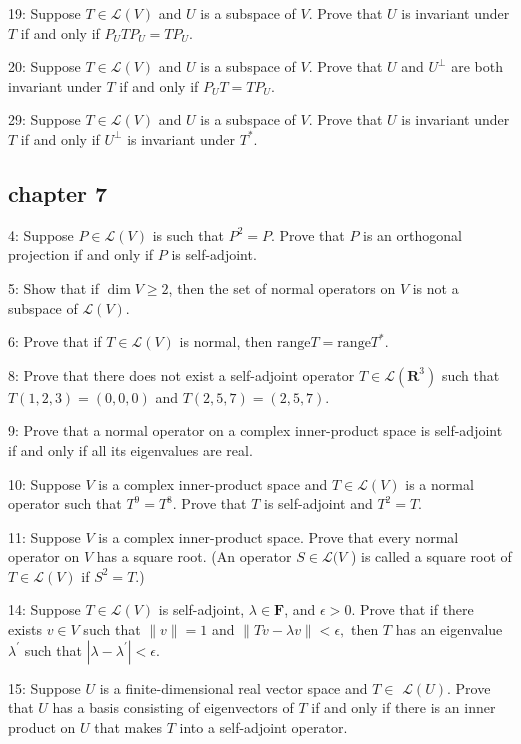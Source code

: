 \documentclass{article}
\begin{document}
19: Suppose $T \in \mathcal{L}(V)$ and $U$ is a subspace of $V$. Prove that $U$ is invariant under $T$ if and only if $P_{U} T P_{U}=T P_{U}$.

20: Suppose $T \in \mathcal{L}(V)$ and $U$ is a subspace of $V$. Prove that $U$ and $U^{\perp}$ are both invariant under $T$ if and only if $P_{U} T=T P_{U}$.

29: Suppose $T \in \mathcal{L}(V)$ and $U$ is a subspace of $V$. Prove that $U$ is invariant under $T$ if and only if $U^{\perp}$ is invariant under $T^{*}$.

\subsection*{chapter 7}
4: Suppose $P \in \mathcal{L}(V)$ is such that $P^{2}=P$. Prove that $P$ is an orthogonal projection if and only if $P$ is self-adjoint.

5: Show that if $\operatorname{dim} V \geq 2$, then the set of normal operators on $V$ is not a subspace of $\mathcal{L}(V)$.

6: Prove that if $T \in \mathcal{L}(V)$ is normal, then $\mathrm{range} T=\mathrm{range} T^{*}.$

8: Prove that there does not exist a self-adjoint operator $T \in \mathcal{L}\left(\mathbf{R}^{3}\right)$ such that $T(1,2,3)=(0,0,0)$ and $T(2,5,7)=(2,5,7)$.

9: Prove that a normal operator on a complex inner-product space is self-adjoint if and only if all its eigenvalues are real.

10: Suppose $V$ is a complex inner-product space and $T \in \mathcal{L}(V)$ is a normal operator such that $T^{9}=T^{8}$. Prove that $T$ is self-adjoint and $T^{2}=T$.

11: Suppose $V$ is a complex inner-product space. Prove that every normal operator on $V$ has a square root. (An operator $S \in \mathcal{L}(V$ ) is called a square root of $T \in \mathcal{L}(V)$ if $S^{2}=T$.)

14: Suppose $T \in \mathcal{L}(V)$ is self-adjoint, $\lambda \in \mathbf{F}$, and $\epsilon>0$. Prove that if there exists $v \in V$ such that $\|v\|=1$ and $\|T v-\lambda v\|<\epsilon,$ then $T$ has an eigenvalue $\lambda^{\prime}$ such that $\left|\lambda-\lambda^{\prime}\right|<\epsilon$.

15: Suppose $U$ is a finite-dimensional real vector space and $T \in$ $\mathcal{L}(U)$. Prove that $U$ has a basis consisting of eigenvectors of $T$ if and only if there is an inner product on $U$ that makes $T$ into a self-adjoint operator.
\end{document}
